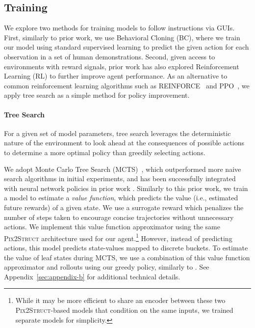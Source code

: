 \subsection{Training}
\label{sec:agent-training}

We explore two methods for training models to follow instructions via GUIs. First, similarly to prior work, we use Behavioral Cloning (BC), where we train our model using standard supervised learning to predict the given action for each observation in a set of human demonstrations. Second, given access to environments with reward signals, prior work has also explored Reinforcement Learning (RL) to further improve agent performance. As an alternative to common reinforcement learning algorithms such as REINFORCE~\citep{Williams2004SimpleSG} and PPO~\citep{Schulman2017ProximalPO}, we apply tree search as a simple method for policy improvement.

\paragraph{Tree Search} For a given set of model parameters, tree search leverages the deterministic nature of the environment to look ahead at the consequences of possible actions to determine a more optimal policy than greedily selecting actions.

We adopt Monte Carlo Tree Search (MCTS)~\citep{Coulom2006EfficientSA}, which outperformed more naive search algorithms in initial experiments, and has been successfully integrated with neural network policies in prior work \citep{silver2017mastering,anthony2017thinking}. Similarly to this prior work, we train a model to estimate a \emph{value function}, which predicts the value (i.e., estimated future rewards) of a given state. We use a surrogate reward which penalizes the number of steps taken to encourage concise trajectories without unnecessary actions. We implement this value function approximator using the same \textsc{Pix2Struct} architecture used for our agent.\footnote{While it may be more efficient to share an encoder between these two \textsc{Pix2Struct}-based models that condition on the same inputs, we trained separate models for simplicity.} However, instead of predicting actions, this model predicts state-values mapped to discrete buckets. To estimate the value of leaf states during MCTS, we use a combination of this value function approximator and rollouts using our greedy policy, similarly to \citet{silver2017mastering}. See Appendix~\ref{sec:appendix-b} for additional technical details.

